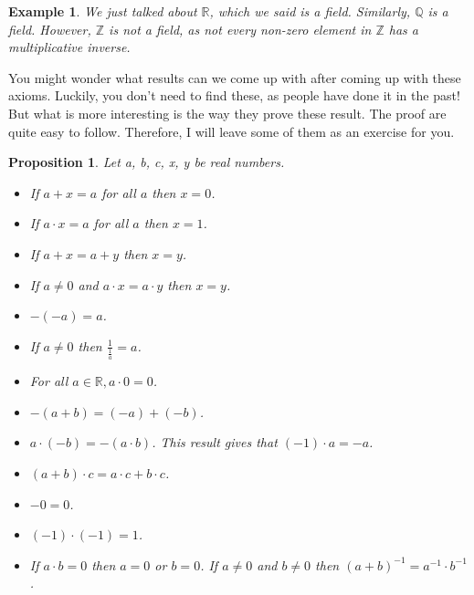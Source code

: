 \documentclass{book}
\newtheorem{example}[theorem]{Example}
\newtheorem{proposition}[theorem]{Proposition}
\begin{document}
\begin{example}
    We just talked about $\mathbb{R}$, which we said is a field. Similarly, $\mathbb{Q}$ is a field. However, $\mathbb{Z}$ is not a field, as not every non-zero element in $\mathbb{Z}$ has a multiplicative inverse.
\end{example}

You might wonder what results can we come up with after coming up with these axioms. Luckily, you don't need to find these, as people have done it in the past! But what is more interesting is the way they prove these result. The proof are quite easy to follow. Therefore, I will leave some of them as an exercise for you.

\begin{proposition} \label{Proposition 1.5.3}
    Let a, b, c, x, y be real numbers.
    \begin{itemize}[itemsep = 0pt]
        \item[(1)] If $a + x = a$ for all $a$ then $x = 0$.
        \item[(2)] If $a \cdot x = a$ for all $a$ then $x = 1$.
        \item[(3)] If $a + x = a + y$ then $x = y$.
        \item[(4)] If $a \neq 0$ and $a \cdot x = a \cdot y$ then $x = y$.
        \item[(5)] $-(-a) = a$.
        \item[(6)] If $a \neq 0$ then $\frac{1}{\frac{1}{a}} = a$.
        \item[(7)] For all $a \in \mathbb{R}, a \cdot 0 = 0$.
        \item[(8)] $-(a + b) = (-a) + (-b)$.
        \item[(9)] $a \cdot (-b) = -(a \cdot b)$. This result gives that $(-1) \cdot a = -a$.
        \item[(10)] $(a + b) \cdot c = a \cdot c + b \cdot c$.
        \item[(11)] $-0 = 0$.
        \item[(12)] $(-1) \cdot (-1) = 1$.
        \item[(13)] If $a \cdot b = 0$ then $a = 0$ or $b = 0$. If $a \neq 0$ and $b \neq 0$ then $(a + b)^{-1} = a^{-1} \cdot b^{-1}$.
    \end{itemize}
\end{proposition}
\end{document}
